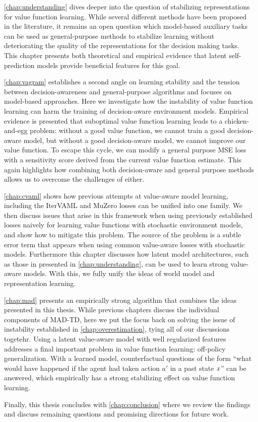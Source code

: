 \autoref{chap:understanding} dives deeper into the question of stabilizing representations for value function learning.
While several different methods have been proposed in the literature, it remains an open question which model-based auxiliary tasks can be used as general-purpose methods to stabilize learning without deteriorating the quality of the representations for the decision making tasks.
This chapter presents both theoretical and empirical evidence that latent self-prediction models provide beneficial features for this goal.

\autoref{chap:vagram} establishes a second angle on learning stability and the tension between decision-awareness and general-purpose algorithms and focuses on model-based approaches.
Here we investigate how the instability of value function learning can harm the training of decision-aware environment models.
Empirical evidence is presented that suboptimal value function learning leads to a chicken-and-egg problem: without a good value function, we cannot train a good decision-aware model, but without a good decision-aware model, we cannot improve our value function.
To escape this cycle, we can modify a general purpose MSE loss with a sensitivity score derived from the current value function estimate.
This again highlights how combining both decision-aware and general purpose methods allows us to overcome the challenges of either.

\autoref{chap:cvaml} shows how previous attempts at value-aware model learning, including the IterVAML \parencite{itervaml} and MuZero \parencite{schrittwieser2020mastering} losses can be unified into one family. 
We then discuss issues that arise in this framework when using previously established losses naively for learning value functions with stochastic environment models, and show how to mitigate this problem.
The source of the problem is a subtle error term that appears when using common value-aware losses with stochastic models.
Furthermore this chapter discusses how latent model architectures, such as those in presented in \autoref{chap:understanding}, can be used to learn strong value-aware models.
With this, we fully unify the ideas of world model and representation learning.

\autoref{chap:mad} presents an empirically strong algorithm that combines the ideas presented in this thesis.
While previous chapters discuss the individual components of MAD-TD, here we put the focus back on solving the issue of instability established in \autoref{chap:overestimation}, tying all of our discussions togetehr.
Using a latent value-aware model with well regularized features addresses a final important problem in value function learning: off-policy generalization.
With a learned model, counterfactual questions of the form ``what would have happened if the agent had taken action $a'$ in a past state $x$'' can be answered, which empirically has a strong stabilizing effect on value function learning.

Finally, this thesis concludes with \autoref{chap:conclusion} where we review the findings and discuss remaining questions and promising directions for future work.


